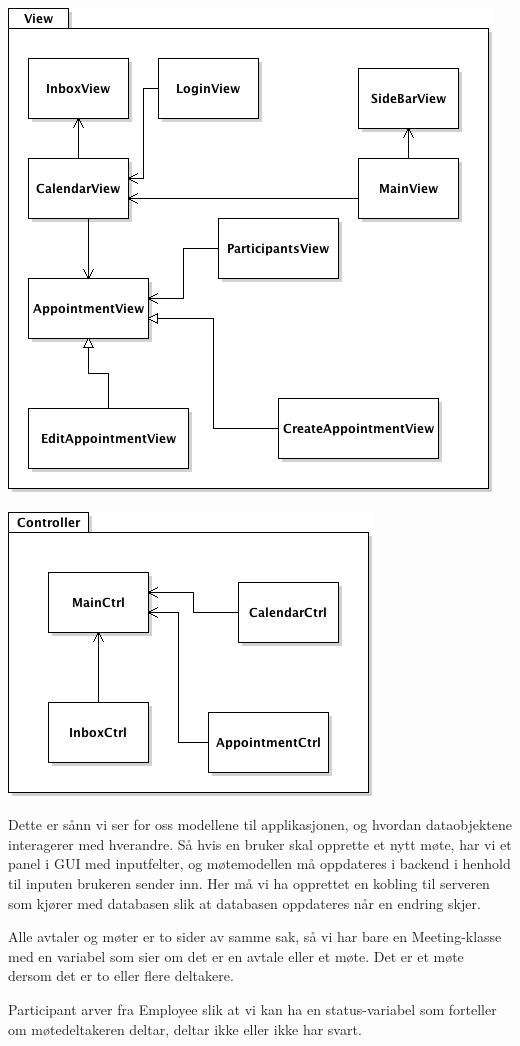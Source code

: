 \includegraphics[width=\textwidth]{klassediagramView.jpg}

\includegraphics[width=\textwidth]{klassediagramCtrl.jpg}

Dette er sånn vi ser for oss modellene til applikasjonen, og hvordan dataobjektene interagerer med hverandre. Så hvis en bruker skal opprette et nytt møte, har vi et panel i GUI med inputfelter, og møtemodellen må oppdateres i backend i henhold til inputen brukeren sender inn. Her må vi ha opprettet en kobling til serveren som kjører med databasen slik at databasen oppdateres når en endring skjer. 

Alle avtaler og møter er to sider av samme sak, så vi har bare en Meeting-klasse med en variabel som sier om det er en avtale eller et møte. Det er et møte dersom det er to eller flere deltakere. 

Participant arver fra Employee slik at vi kan ha en status-variabel som forteller om møtedeltakeren deltar, deltar ikke eller ikke har svart. 

